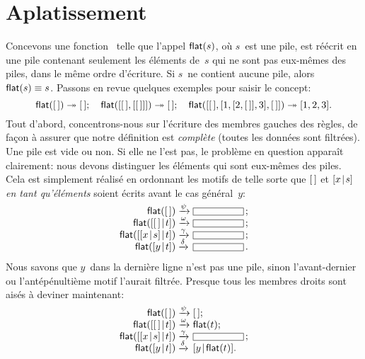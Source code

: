 \section{Aplatissement}
\label{sec:flattening}

Concevons une fonction~ telle que
l'appel \(\textsf{flat}(s)\), où \(s\)~est une pile, est réécrit en une
pile contenant seulement les éléments de~\(s\) qui ne sont pas
eux-mêmes des piles, dans le même ordre d'écriture. Si \(s\)~ne
contient aucune pile, alors \(\textsf{flat}(s) \equiv s\). Passons en
revue quelques exemples pour saisir
le concept:
\begin{equation*}
\textsf{flat}([\,]) \twoheadrightarrow [\,]; \quad
\textsf{flat}([[\,],[[\,]]]) \twoheadrightarrow [\,];\quad
\textsf{flat}([[\,],[1,[2,[\,]],3],[\,]]) \twoheadrightarrow [1,2,3].
\end{equation*}
Tout d'abord, concentrons-nous sur l'écriture des membres gauches des
règles, de façon à assurer que notre définition est \emph{complète}
(toutes les données sont filtrées). Une pile est vide ou non. Si elle
ne l'est pas, le problème en question apparaît clairement: nous devons
distinguer les éléments qui sont eux-mêmes des piles. Cela est
simplement réalisé en ordonnant les motifs de telle sorte que \([\,]\)
et \([{x}\!\mid\!{s}]\) \emph{en tant qu'éléments} soient écrits avant le
cas général~\(y\):
\begin{equation*}
\begin{array}{r@{\;}l@{\;}l}
\fun{flat}(\el)                   & \xrightarrow{\smash{\psi}}   & \fbcode{CCCCCCC}\,;\\
\fun{flat}(\cons{\el}{t})         & \xrightarrow{\smash{\omega}} & \fbcode{CCCCCCC}\,;\\
\fun{flat}(\cons{\cons{x}{s}}{t}) & \xrightarrow{\smash{\gamma}} & \fbcode{CCCCCCC}\,;\\
\fun{flat}(\cons{y}{t})           & \xrightarrow{\smash{\delta}} & \fbcode{CCCCCCC}\,.
\end{array}
\end{equation*}
Nous savons que \(y\)~dans la dernière ligne n'est pas une pile, sinon
l'avant-dernier ou l'antépénultième motif l'aurait filtrée. Presque tous les mem\-bres droits sont aisés à deviner maintenant:
\begin{equation*}
\begin{array}{r@{\;}l@{\;}l}
\fun{flat}(\el)                   & \xrightarrow{\smash{\psi}}   & \el;\\
\fun{flat}(\cons{\el}{t})         & \xrightarrow{\smash{\omega}} & \fun{flat}(t);\\
\fun{flat}(\cons{\cons{x}{s}}{t}) & \xrightarrow{\smash{\gamma}} & \fbcode{CCCCCCC}\,;\\
\fun{flat}(\cons{y}{t})           & \xrightarrow{\smash{\delta}} & \cons{y}{\fun{flat}(t)}.
\end{array}
\end{equation*}
